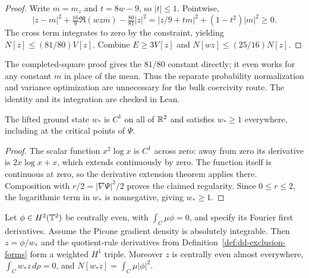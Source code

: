 \begin{proof}
\leanok
Write $m=m_z$ and $t=8w-9$, so $|t|\le1$. Pointwise,
\[
 |z-m|^2+\tfrac{16}{9}\Re(wz\overline m)-\tfrac{80}{81}|z|^2
 =|z/9+tm|^2+(1-t^2)|m|^2\ge0.
\]
The cross term integrates to zero by the constraint, yielding
$N[z]\le(81/80)V[z]$.
Combine $E\ge3V[z]$ and $N[wz]\le(25/16)N[z]$.
\end{proof}

\begin{remark}
The completed-square proof gives the $81/80$ constant directly; it even
works for any constant $m$ in place of the mean. Thus the separate
probability normalization and variance optimization are unnecessary for the
bulk coercivity route. The identity and its integration are checked in Lean.
\end{remark}

\begin{lemma}
\label{lem:dd-ground-c1}
\leanok
The lifted ground state $w_*$ is $C^1$ on all of $\mathbb{R}^2$ and satisfies
$w_*\ge1$ everywhere, including at the critical points of $\Psi$.
\end{lemma}

\begin{proof}
\leanok
The scalar function $x^2\log x$ is $C^1$ across zero: away from zero its
derivative is $2x\log x+x$, which extends continuously by zero.
The function itself is continuous at zero, so the derivative extension
theorem applies there. Composition with $r/2=|\nabla\Psi|^2/2$ proves
the claimed regularity. Since $0\le r\le2$, the logarithmic term in
$w_*$ is nonnegative, giving $w_*\ge1$.
\end{proof}

\begin{lemma}
\label{lem:dd-bulk-form-domain}
\leanok
Let $\phi\in H^2(\mathbb{T}^2)$ be centrally even, with
$\int_C\mu\phi=0$, and specify its Fourier first derivatives.
Assume the Picone gradient density is absolutely integrable.
Then $z=\phi/w_*$ and the quotient-rule derivatives from
Definition~\ref{def:dd-exclusion-forms} form a weighted $H^1$ triple.
Moreover $z$ is centrally even almost everywhere,
$\int_C w_*z\,d\rho=0$, and $N[w_*z]=\int_C\mu|\phi|^2$.
\end{lemma}

